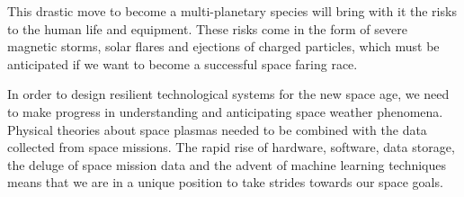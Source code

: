 This drastic move to become a multi-planetary species will bring with it the risks to the human 
life and equipment. These risks come in the form of severe magnetic storms, solar flares and 
ejections of charged particles, which must be anticipated if we want to become a successful space 
faring race. 

In order to design resilient technological systems for the new space age, we need to make progress 
in understanding and anticipating space weather phenomena. Physical theories about space plasmas 
needed to be combined with the data collected from space missions. The rapid rise of hardware, 
software, data storage, the deluge of space mission data and the advent of machine learning 
techniques means that we are in a unique position to take strides towards our space goals.


%
%

